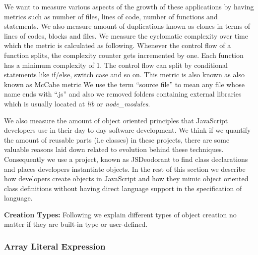 We want to measure various aspects of the growth of these applications by having metrics such as number of files, lines of code, number of functions and statements. We also measure amount of duplications known as clones in terms of lines of codes, blocks and files. We measure the cyclomatic complexity over time which the metric is calculated as following. Whenever the control flow of a function splits, the complexity counter gets incremented by one. Each function has a minimum complexity of 1. The control flow can split by conditional statements like if/else, switch case and so on. This metric is also known as also known as McCabe metric
We use the term “source file” to mean any file whose name ends with “.js” and also we removed folders containing external libraries which is usually located at \textit{lib} or \textit{node\_modules}. 

We also measure the amount of object oriented principles that JavaScript developers use in their day to day software development. We think if we quantify the amount of reusable parts (i.e classes) in these projects, there are some valuable reasons laid down related to evolution behind these techniques. Consequently we use a project, known as JSDeodorant to find class declarations and places developers instantiate objects.
In the rest of this section we describe how developers create objects in JavaScript and how they mimic object oriented class definitions without having direct language support in the specification of language.

\noindent\textbf{Creation Types:} Following we explain different types of object creation no matter if they are built-in type or user-defined. 

\medskip
\noindent\subsubsection{Array Literal Expression}

